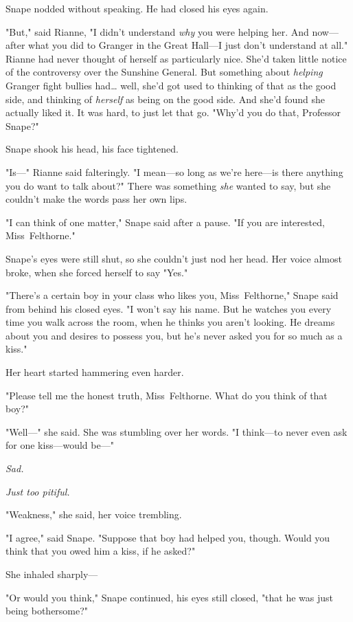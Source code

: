 Snape nodded without speaking. He had closed his eyes again.

"But," said Rianne, "I didn't understand \emph{why} you were helping her. And
now---after what you did to Granger in the Great Hall---I just don't understand
at all." Rianne had never thought of herself as particularly nice. She'd taken
little notice of the controversy over the Sunshine General. But something about
\emph{helping} Granger fight bullies had{\ldots} well, she'd got used to
thinking of that as the good side, and thinking of \emph{herself} as being on
the good side. And she'd found she actually liked it. It was hard, to just let
that go. "Why'd you do that, Professor Snape?"

Snape shook his head, his face tightened.

"Is---" Rianne said falteringly. "I mean---so long as we're here---is there
anything you do want to talk about?" There was something \emph{she} wanted to
say, but she couldn't make the words pass her own lips.

"I can think of one matter," Snape said after a pause. "If you are interested,
Miss~Felthorne."

Snape's eyes were still shut, so she couldn't just nod her head. Her voice
almost broke, when she forced herself to say "Yes."

"There's a certain boy in your class who likes you, Miss~Felthorne," Snape said
from behind his closed eyes. "I won't say his name. But he watches you every
time you walk across the room, when he thinks you aren't looking. He dreams
about you and desires to possess you, but he's never asked you for so much as a
kiss."

Her heart started hammering even harder.

"Please tell me the honest truth, Miss~Felthorne. What do you think of that
boy?"

"Well---" she said. She was stumbling over her words. "I think---to never even
ask for one kiss---would be---"

\emph{Sad.}

\emph{Just too pitiful.}

"Weakness," she said, her voice trembling.

"I agree," said Snape. "Suppose that boy had helped you, though. Would you
think that you owed him a kiss, if he asked?"

She inhaled sharply---

"Or would you think," Snape continued, his eyes still closed, "that he was just
being bothersome?"

